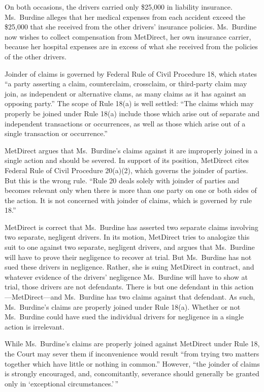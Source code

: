 \documentclass[11pt,letterpaper,twoside]{article}
\begin{document}
On both occasions, the drivers carried only \$25,000 in liability
insurance. Ms.~Burdine alleges that her medical expenses from each
accident exceed the \$25,000 that she received from the other drivers'
insurance policies. Ms.~Burdine now wishes to collect compensation from
MetDirect, her own insurance carrier, because her hospital expenses are
in excess of what she received from the policies of the other drivers.

Joinder of claims is governed by Federal Rule of Civil Procedure 18,
which states ``a party asserting a claim, counterclaim, crossclaim, or
third-party claim may join, as independent or alternative clams, as many
claims as it has against an opposing party.'' The scope of Rule 18(a) is
well settled: ``The claims which may properly be joined under Rule 18(a)
include those which arise out of separate and independent transactions
or occurrences, as well as those which arise out of a single transaction
or occurrence.''

MetDirect argues that Ms.~Burdine's claims against it are improperly
joined in a single action and should be severed. In support of its
position, MetDirect cites Federal Rule of Civil Procedure 20(a)(2),
which governs the joinder of parties. But this is the wrong rule. ``Rule
20 deals solely with joinder of parties and becomes relevant only when
there is more than one party on one or both sides of the action. It is
not concerned with joinder of claims, which is governed by rule 18.''

MetDirect is correct that Ms.~Burdine has asserted two separate claims
involving two separate, negligent drivers. In its motion, MetDirect
tries to analogize this suit to one against two separate, negligent
drivers, and argues that Ms.~Burdine will have to prove their negligence
to recover at trial. But Ms.~Burdine has not sued these drivers in
negligence. Rather, she is suing MetDirect in contract, and whatever
evidence of the drivers' negligence Ms.~Burdine will have to show at
trial, those drivers are not defendants. There is but one defendant in
this action---MetDirect---and Ms.~Burdine has two claims against that
defendant. As such, Ms.~Burdine's claims are properly joined under Rule
18(a). Whether or not Ms.~Burdine could have sued the individual drivers
for negligence in a single action is irrelevant.

While Ms.~Burdine's claims are properly joined against MetDirect under
Rule 18, the Court may sever them if inconvenience would result ``from
trying two matters together which have little or nothing in common.''
However, ``the joinder of claims is strongly encouraged, and,
concomitantly, severance should generally be granted only in
`exceptional circumstances.'\,''
\end{document}
